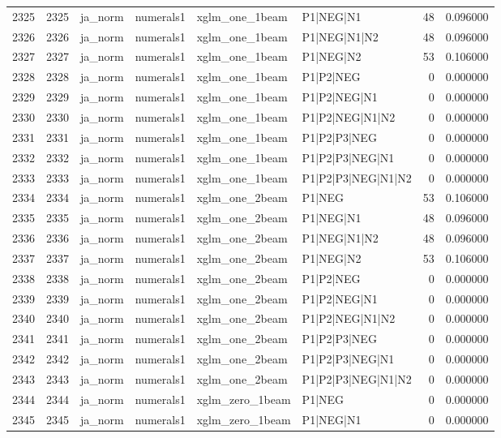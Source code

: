 \begin{tabular}{lrllllrr}
2325 & 2325 & ja_norm & numerals1 & xglm_one_1beam & P1|NEG|N1 & 48 & 0.096000 \\
2326 & 2326 & ja_norm & numerals1 & xglm_one_1beam & P1|NEG|N1|N2 & 48 & 0.096000 \\
2327 & 2327 & ja_norm & numerals1 & xglm_one_1beam & P1|NEG|N2 & 53 & 0.106000 \\
2328 & 2328 & ja_norm & numerals1 & xglm_one_1beam & P1|P2|NEG & 0 & 0.000000 \\
2329 & 2329 & ja_norm & numerals1 & xglm_one_1beam & P1|P2|NEG|N1 & 0 & 0.000000 \\
2330 & 2330 & ja_norm & numerals1 & xglm_one_1beam & P1|P2|NEG|N1|N2 & 0 & 0.000000 \\
2331 & 2331 & ja_norm & numerals1 & xglm_one_1beam & P1|P2|P3|NEG & 0 & 0.000000 \\
2332 & 2332 & ja_norm & numerals1 & xglm_one_1beam & P1|P2|P3|NEG|N1 & 0 & 0.000000 \\
2333 & 2333 & ja_norm & numerals1 & xglm_one_1beam & P1|P2|P3|NEG|N1|N2 & 0 & 0.000000 \\
2334 & 2334 & ja_norm & numerals1 & xglm_one_2beam & P1|NEG & 53 & 0.106000 \\
2335 & 2335 & ja_norm & numerals1 & xglm_one_2beam & P1|NEG|N1 & 48 & 0.096000 \\
2336 & 2336 & ja_norm & numerals1 & xglm_one_2beam & P1|NEG|N1|N2 & 48 & 0.096000 \\
2337 & 2337 & ja_norm & numerals1 & xglm_one_2beam & P1|NEG|N2 & 53 & 0.106000 \\
2338 & 2338 & ja_norm & numerals1 & xglm_one_2beam & P1|P2|NEG & 0 & 0.000000 \\
2339 & 2339 & ja_norm & numerals1 & xglm_one_2beam & P1|P2|NEG|N1 & 0 & 0.000000 \\
2340 & 2340 & ja_norm & numerals1 & xglm_one_2beam & P1|P2|NEG|N1|N2 & 0 & 0.000000 \\
2341 & 2341 & ja_norm & numerals1 & xglm_one_2beam & P1|P2|P3|NEG & 0 & 0.000000 \\
2342 & 2342 & ja_norm & numerals1 & xglm_one_2beam & P1|P2|P3|NEG|N1 & 0 & 0.000000 \\
2343 & 2343 & ja_norm & numerals1 & xglm_one_2beam & P1|P2|P3|NEG|N1|N2 & 0 & 0.000000 \\
2344 & 2344 & ja_norm & numerals1 & xglm_zero_1beam & P1|NEG & 0 & 0.000000 \\
2345 & 2345 & ja_norm & numerals1 & xglm_zero_1beam & P1|NEG|N1 & 0 & 0.000000 \\

\end{tabular}
